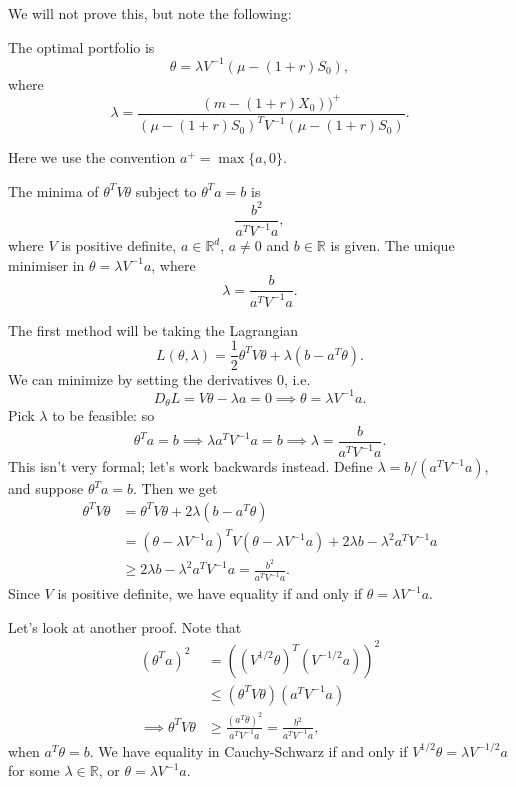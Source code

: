 \documentclass[12pt]{article}
\begin{document}
We will not prove this, but note the following:

\begin{theorem}
	The optimal portfolio is
	\[
	\theta = \lambda V^{-1}(\mu - (1+r)S_0),
	\]
	where
	\[
	\lambda = \frac{(m-(1+r)X_0))^+}{(\mu - (1+r)S_0)^T V^{-1} (\mu - (1+r)S_0)}.
	\]
\end{theorem}

Here we use the convention $a^{+} = \max\{a, 0\}$.


\begin{lemma}
	The minima of $\theta^{T}V\theta$ subject to $\theta^{T}a = b$ is
	\[
	\frac{b^2}{a^{T}V^{-1}a},
	\]
	where $V$ is positive definite, $a \in \mathbb{R}^{d}$, $a \neq 0$ and $b \in \mathbb{R}$ is given. The unique minimiser in $\theta = \lambda V^{-1} a$, where
	\[
	\lambda = \frac{b}{a^{T}V^{-1}a}.
	\]
\end{lemma}

\begin{proofbox}
	The first method will be taking the Lagrangian
	\[
	L(\theta, \lambda) = \frac{1}{2} \theta^{T} V\theta + \lambda(b - a^{T}\theta).
	\]
	We can minimize by setting the derivatives $0$, i.e.
	\[
	D_\theta L = V\theta - \lambda a = 0 \implies \theta = \lambda V^{-1} a.
	\]
	Pick $\lambda$ to be feasible: so
	\[
	\theta^{T} a = b \implies \lambda a^{T} V^{-1} a = b \implies \lambda = \frac{b}{a^{T}V^{-1}a}.
	\]
	This isn't very formal; let's work backwards instead. Define $\lambda = b/(a^{T}V^{-1}a)$, and suppose $\theta^{T}a = b$. Then we get
	\begin{align*}
		\theta^{T}V\theta &= \theta^{T}V\theta + 2\lambda(b - a^{T}\theta) \\
				  &= (\theta - \lambda V^{-1}a)^{T}V(\theta - \lambda V^{-1}a) + 2 \lambda b - \lambda^2 a^{T}V^{-1} a \\
				  &\geq 2 \lambda b - \lambda^2 a^{T} V^{-1} a = \frac{b^2}{a^{T}V^{-1}a}.
	\end{align*}
	Since $V$ is positive definite, we have equality if and only if $\theta = \lambda V^{-1}a$.

	Let's look at another proof. Note that
	\begin{align*}
		(\theta^{T}a)^2 &= ((V^{1/2}\theta)^{T}(V^{-1/2}a))^2 \\
				&\leq (\theta^{T}V\theta)(a^{T}V^{-1}a) \\
		\implies \theta^{T}V\theta &\geq \frac{(a^{T}\theta)^2}{a^{T}V^{-1}a} = \frac{b^2}{a^{T}V^{-1}a},
	\end{align*}
	when $a^{T}\theta = b$. We have equality in Cauchy-Schwarz if and only if $V^{1/2}\theta = \lambda V^{-1/2}a$ for some $\lambda \in \mathbb{R}$, or $\theta = \lambda V^{-1}a$.
\end{proofbox}
\end{document}
